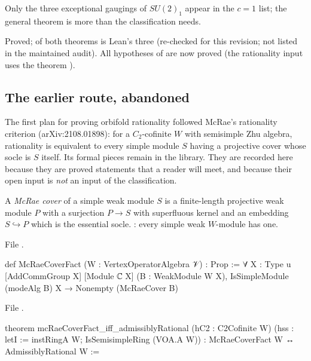 \begin{physics}
Only the three exceptional gaugings of $SU(2)_1$ appear in the $c=1$ list; the general theorem is more than the
classification needs.
\end{physics}

\begin{status}
Proved;  of both theorems is Lean's three (re-checked for this revision; not listed in the
maintained audit). All hypotheses of  are now proved (the rationality input uses the theorem
).
\end{status}

\subsection{The earlier route, abandoned}\label{l22:sec:oldroute}

The first plan for proving orbifold rationality followed McRae's rationality criterion (arXiv:2108.01898): for a $C_2$-cofinite $W$ with
semisimple Zhu algebra, rationality is equivalent to every simple module $S$ having a projective cover whose socle is
$S$ itself. Its formal pieces remain in the library. They are recorded here because they are proved statements that a
reader will meet, and because their open input is \emph{not} an input of the classification.

\begin{definition}\label{l22:def:mcrae}
A \emph{McRae cover} of a simple weak module $S$ is a finite-length projective weak module $P$ with a surjection
$P\to S$ with superfluous kernel and an embedding $S\hookrightarrow P$ which is the essential socle.
: every simple weak $W$-module has one.
\end{definition}
\noindent File .
\begin{leancode}
def McRaeCoverFact (W : VertexOperatorAlgebra 𝒱) : Prop :=
  ∀ {X : Type u} [AddCommGroup X] [Module ℂ X] (B : WeakModule W X),
    IsSimpleModule (modeAlg B) X → Nonempty (McRaeCover B)
\end{leancode}
\noindent File .
\begin{leancode}
theorem mcRaeCoverFact_iff_admissiblyRational (hC2 : C2Cofinite W)
    (hss : letI := instRingA W; IsSemisimpleRing (VOA.A W)) :
    McRaeCoverFact W ↔ AdmissiblyRational W :=
\end{leancode}

